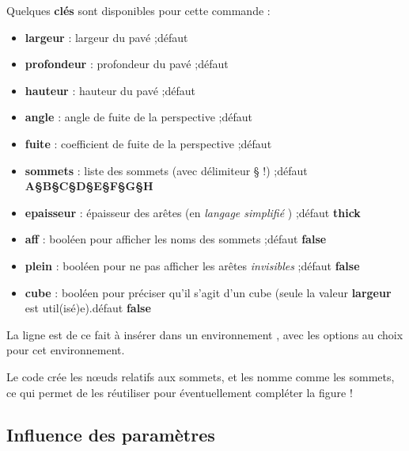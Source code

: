 \documentclass{article}
\newcommand\Cle[1]{{\bfseries\sffamily\textlangle #1\textrangle}}
\begin{document}
\begin{codecles}
Quelques \Cle{clés} sont disponibles pour cette commande :

\begin{itemize}
	\item \Cle{largeur} : largeur du pavé ;\hfill{}défaut \Cle{2}
	\item \Cle{profondeur} : profondeur du pavé ;\hfill{}défaut \Cle{1}
	\item \Cle{hauteur} : hauteur du pavé ;\hfill{}défaut \Cle{1.25}
	\item \Cle{angle} : angle de fuite de la perspective ;\hfill{}défaut \Cle{30}
	\item \Cle{fuite} : coefficient de fuite de la perspective ;\hfill{}défaut \Cle{0.5}
	\item \Cle{sommets} : liste des sommets (avec délimiteur § !) ;\hfill{}défaut \Cle{A§B§C§D§E§F§G§H}
	\item \Cle{epaisseur} : épaisseur des arêtes (en \textit{langage simplifié} \TikZ) ;\hfill{}défaut \Cle{thick}
	\item \Cle{aff} : booléen pour afficher les noms des sommets ;\hfill{}défaut \Cle{false}
	\item \Cle{plein} : booléen pour ne pas afficher les arêtes \textit{invisibles} ;\hfill{}défaut \Cle{false}
	\item \Cle{cube} : booléen pour préciser qu'il s'agit d'un cube (seule la valeur \Cle{largeur} est util(isé)e).\hfill{}défaut \Cle{false}
\end{itemize}
\end{codecles}

\begin{codetex}
\pavePL
\end{codetex}

\begin{codetex}
\pavePL[cube,largeur=3]
\end{codetex}

\begin{codeinfo}
La ligne est de ce fait à insérer dans un environnement \TikZ, avec les options au choix pour cet environnement.

Le code crée les nœuds relatifs aux sommets, et les nomme comme les sommets, ce qui permet de les réutiliser pour éventuellement compléter la figure !
\end{codeinfo}

\subsection{Influence des paramètres}
\end{document}

